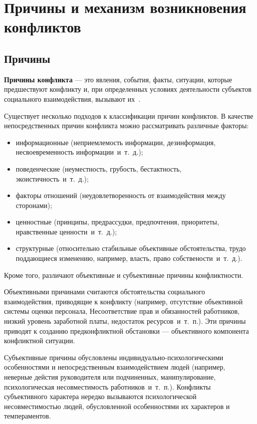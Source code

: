 \chapter{Причины и механизм возникновения конфликтов}

\section{Причины}

\textbf{Причины конфликта} — это явления, события, факты, ситуации, которые
предшествуют конфликту и, при определенных условиях деятельности субъектов
социального взаимодействия, вызывают их~\cite{book04}.

Существует несколько подходов к классификации причин конфликтов. В
качестве непосредственных причин конфликта можно рассматривать различные
факторы:

\begin{itemize}
    \item информационные (неприемлемость информации, дезинформация,
        несвоевременность информации~и~т.~д.);
    \item поведенческие (неуместность, грубость, бестактность,
        экоистичность~и~т.~д.);
    \item факторы отношений (неудовлетворенность от
        взаимодействия между сторонами);
    \item ценностные (принципы, предрассудки, предпочтения,
        приоритеты, нравственные ценности~и~т.~д.);
    \item структурные (относительно стабильные объективные
        обстоятельства, трудо поддающиеся изменению, например, власть, право
        собствености~и~т.~д.).
\end{itemize}

Кроме того, различают объективные и субъективные причины конфликтности.

Объективными причинами считаются обстоятельства социального взаимодействия,
приводящие к конфликту (например, отсутствие объективной системы оценки
персонала, Несоответствие прав и обязанностей работников, низкий уровень
заработной платы, недостаток ресурсов~и~т.~п.). Эти причины приводят к созданию
предконфликтной обстановки --- объективного компонента конфликтной ситуации.

Субъективные причины обусловлены
индивидуально-психологическими особенностями и непосредственным взаимодействием
людей (например, неверные дейстия руководителя или подчиненных, манипулирование,
психологическая несовместимость работников~и~т.~п.). Конфликты
субъективного характера нередко вызываются психологической несовместимостью
людей, обусловленной особенностями их характеров и темпераментов.


